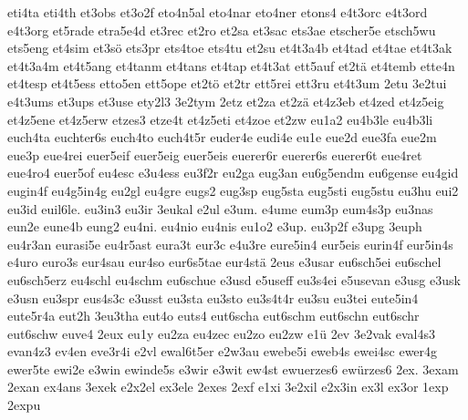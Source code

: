 {    eti4ta
    eti4th
    et3obs
    et3o2f
    eto4n5al
    eto4nar
    eto4ner
    etons4
    e4t3orc
    e4t3ord
    e4t3org
    et5rade
    etra5e4d
    et3rec
    et2ro
    et2sa
    et3sac
    ets3ae
    etscher5e
    etsch5wu
    ets5eng
    et4sim
    et3sö
    ets3pr
    ets4toe
    ets4tu
    et2su
    et4t3a4b
    et4tad
    et4tae
    et4t3ak
    et4t3a4m
    et4t5ang
    et4tanm
    et4tans
    et4tap
    et4t3at
    ett5auf
    et2tä
    et4temb
    ette4n
    et4tesp
    et4t5ess
    etto5en
    ett5ope
    et2tö
    et2tr
    ett5rei
    ett3ru
    et4t3um
    2etu
    3e2tui
    e4t3ums
    et3ups
    et3use
    ety2l3
    3e2tym
    2etz
    et2za
    et2zä
    et4z3eb
    et4zed
    et4z5eig
    et4z5ene
    et4z5erw
    etzes3
    etze4t
    et4z5eti
    et4zoe
    et2zw
    eu1a2
    eu4b3le
    eu4b3li
    euch4ta
    euchter6s
    euch4to
    euch4t5r
    euder4e
    eudi4e
    eu1e
    eue2d
    eue3fa
    eue2m
    eue3p
    eue4rei
    euer5eif
    euer5eig
    euer5eis
    euerer6r
    euerer6s
    euerer6t
    eue4ret
    eue4ro4
    euer5of
    eu4esc
    e3u4ess
    eu3f2r
    eu2ga
    eug3an
    eu6g5endm
    eu6gense
    eu4gid
    eugin4f
    eu4g5in4g
    eu2gl
    eu4gre
    eugs2
    eug3sp
    eug5sta
    eug5sti
    eug5stu
    eu3hu
    eui2
    eu3id
    euil6le.
    eu3in3
    eu3ir
    3eukal
    e2ul
    e3um.
    e4ume
    eum3p
    eum4s3p
    eu3nas
    eun2e
    eune4b
    eung2
    eu4ni.
    eu4nio
    eu4nis
    eu1o2
    e3up.
    eu3p2f
    e3upg
    3euph
    eu4r3an
    eurasi5e
    eu4r5ast
    eura3t
    eur3c
    e4u3re
    eure5in4
    eur5eis
    eurin4f
    eur5in4s
    e4uro
    euro3s
    eur4sau
    eur4so
    eur6s5tae
    eur4stä
    2eus
    e3usar
    eu6sch5ei
    eu6schel
    eu6sch5erz
    eu4schl
    eu4schm
    eu6schue
    e3usd
    e5useff
    eu3s4ei
    e5usevan
    e3usg
    e3usk
    e3usn
    eu3spr
    eus4s3c
    e3usst
    eu3sta
    eu3sto
    eu3s4t4r
    eu3su
    eu3tei
    eute5in4
    eute5r4a
    eut2h
    3eu3tha
    eut4o
    euts4
    eut6scha
    eut6schm
    eut6schn
    eut6schr
    eut6schw
    euve4
    2eux
    eu1y
    eu2za
    eu4zec
    eu2zo
    eu2zw
    e1ü
    2ev
    3e2vak
    eval4s3
    evan4z3
    ev4en
    eve3r4i
    e2vl
    ewal6t5er
    e2w3au
    ewebe5i
    eweb4s
    ewei4sc
    ewer4g
    ewer5te
    ewi2e
    e3win
    ewinde5s
    e3wir
    e3wit
    ew4st
    ewuerzes6
    ewürzes6
    2ex.
    3exam
    2exan
    ex4ans
    3exek
    e2x2el
    ex3ele
    2exes
    2exf
    e1xi
    3e2xil
    e2x3in
    ex3l
    ex3or
    1exp
    2expu
}
